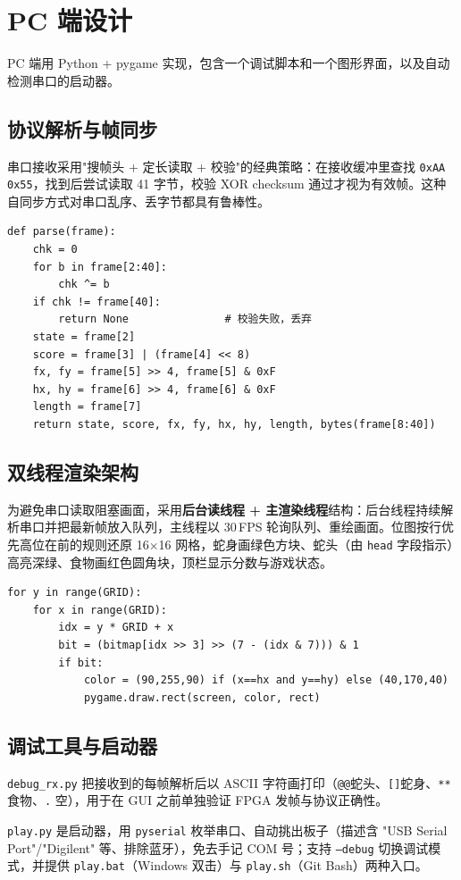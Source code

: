 \section{PC 端设计}

PC 端用 Python + pygame 实现，包含一个调试脚本和一个图形界面，以及自动检测串口的启动器。

\subsection{协议解析与帧同步}

串口接收采用"搜帧头 + 定长读取 + 校验"的经典策略：在接收缓冲里查找 \texttt{0xAA 0x55}，找到后尝试读取 41 字节，校验 XOR checksum 通过才视为有效帧。这种自同步方式对串口乱序、丢字节都具有鲁棒性。

\begin{lstlisting}[style=py, caption={帧解析（snake\_gui.py）}]
def parse(frame):
    chk = 0
    for b in frame[2:40]:
        chk ^= b
    if chk != frame[40]:
        return None               # 校验失败，丢弃
    state = frame[2]
    score = frame[3] | (frame[4] << 8)
    fx, fy = frame[5] >> 4, frame[5] & 0xF
    hx, hy = frame[6] >> 4, frame[6] & 0xF
    length = frame[7]
    return state, score, fx, fy, hx, hy, length, bytes(frame[8:40])
\end{lstlisting}

\subsection{双线程渲染架构}

为避免串口读取阻塞画面，采用\textbf{后台读线程 + 主渲染线程}结构：后台线程持续解析串口并把最新帧放入队列，主线程以 30\,FPS 轮询队列、重绘画面。位图按行优先高位在前的规则还原 16$\times$16 网格，蛇身画绿色方块、蛇头（由 \texttt{head} 字段指示）高亮深绿、食物画红色圆角块，顶栏显示分数与游戏状态。

\begin{lstlisting}[style=py, caption={主渲染循环（节选）}]
for y in range(GRID):
    for x in range(GRID):
        idx = y * GRID + x
        bit = (bitmap[idx >> 3] >> (7 - (idx & 7))) & 1
        if bit:
            color = (90,255,90) if (x==hx and y==hy) else (40,170,40)
            pygame.draw.rect(screen, color, rect)
\end{lstlisting}

\subsection{调试工具与启动器}

\texttt{debug\_rx.py} 把接收到的每帧解析后以 ASCII 字符画打印（\texttt{@@}蛇头、\texttt{[]}蛇身、\texttt{**}食物、\texttt{.} 空），用于在 GUI 之前单独验证 FPGA 发帧与协议正确性。

\texttt{play.py} 是启动器，用 \texttt{pyserial} 枚举串口、自动挑出板子（描述含 "USB Serial Port"/"Digilent" 等、排除蓝牙），免去手记 COM 号；支持 \texttt{--debug} 切换调试模式，并提供 \texttt{play.bat}（Windows 双击）与 \texttt{play.sh}（Git Bash）两种入口。
